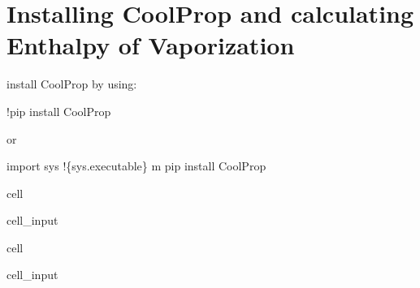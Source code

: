 \documentclass[letterpaper,10pt,english]{jupyterBook}
\begin{document}
\section{Installing CoolProp and calculating Enthalpy of Vaporization}
\label{\detokenize{notebooks/getting_started/basic_math:installing-coolprop-and-calculating-enthalpy-of-vaporization}}
\sphinxAtStartPar
install CoolProp by using:

\sphinxAtStartPar
!pip install CoolProp

\sphinxAtStartPar
or

\sphinxAtStartPar
import sys
!\{sys.executable\} \sphinxhyphen{}m pip install CoolProp

\begin{sphinxuseclass}{cell}\begin{sphinxVerbatimInput}

\begin{sphinxuseclass}{cell_input}
\begin{sphinxVerbatim}[commandchars=\\\{\}]
   
\end{sphinxVerbatim}

\end{sphinxuseclass}\end{sphinxVerbatimInput}

\end{sphinxuseclass}
\begin{sphinxuseclass}{cell}\begin{sphinxVerbatimInput}

\begin{sphinxuseclass}{cell_input}
\begin{sphinxVerbatim}[commandchars=\\\{\}]
       
       
\end{sphinxVerbatim}

\end{sphinxuseclass}\end{sphinxVerbatimInput}

\end{sphinxuseclass}
\end{document}
